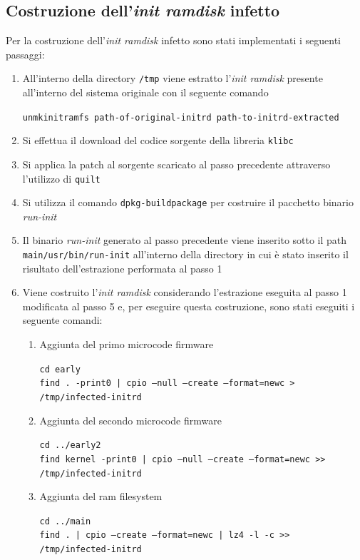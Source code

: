 \documentclass[oneside]{article}
\begin{document}
\subsection{Costruzione dell'\textit{init ramdisk} infetto}
Per la costruzione dell'\textit{init ramdisk} infetto sono stati implementati i seguenti passaggi:
\begin{enumerate}
\item All'interno della directory \texttt{/tmp} viene estratto l'\textit{init ramdisk} presente all'interno del sistema originale con il seguente comando
\begin{tcolorbox}
\texttt{unmkinitramfs path-of-original-initrd path-to-initrd-extracted}
\end{tcolorbox}
\item Si effettua il download del codice sorgente della libreria \texttt{klibc}
\item Si applica la patch al sorgente scaricato al passo precedente attraverso l'utilizzo di \texttt{quilt}
\item Si utilizza il comando \texttt{dpkg-buildpackage} per costruire il pacchetto binario \textit{run-init}
\item Il binario \textit{run-init} generato al passo precedente viene inserito sotto il path \texttt{main/usr/bin/run-init} all'interno della directory in cui è stato inserito il risultato dell'estrazione performata al passo 1
\item Viene costruito l'\textit{init ramdisk} considerando l'estrazione eseguita al passo 1 modificata al passo 5 e, per eseguire questa costruzione, sono stati eseguiti i seguente comandi:
\begin{enumerate}
\item Aggiunta del primo microcode firmware
\begin{tcolorbox}
\texttt{cd early} \\
\texttt{find . -print0 | cpio --null --create --format=newc > /tmp/infected-initrd}
\end{tcolorbox}

\item Aggiunta del secondo microcode firmware
\begin{tcolorbox}
\texttt{cd ../early2} \\
\texttt{find kernel -print0 | cpio --null --create --format=newc >> /tmp/infected-initrd}
\end{tcolorbox}

\item Aggiunta del ram filesystem
\begin{tcolorbox}
\texttt{cd ../main} \\
\texttt{find . | cpio --create --format=newc | lz4 -l -c >> /tmp/infected-initrd}
\end{tcolorbox}


\end{enumerate}
\end{enumerate}
\end{document}
